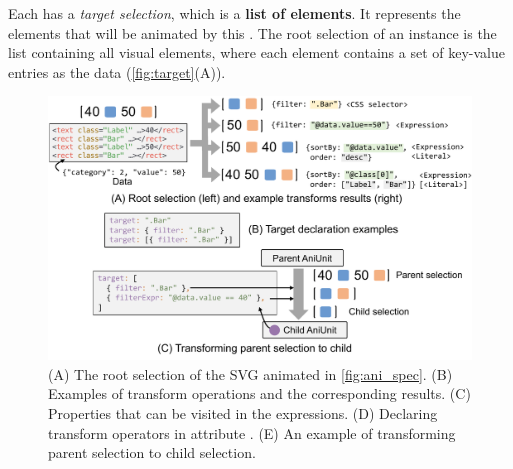
Each \aniunit{} has a \textit{target selection}, which is a \textbf{list of elements}.
It represents the elements that will be animated by this \aniunit{}.
The root selection of an instance is the list containing all visual elements, where each element contains a set of key-value entries as the data (\autoref{fig:target}(A)).

\begin{figure}[h]
  \centering
  \includegraphics[width=\linewidth]{figs/transform.pdf}
  \caption{
  (A) The root selection of the SVG animated in \autoref{fig:ani_spec}. 
  (B) Examples of transform operations and the corresponding results.
  (C) Properties that can be visited in the expressions.
  (D) Declaring transform operators in attribute .
  (E) An example of transforming parent selection to child selection.
  }
  \label{fig:target}
\end{figure}

